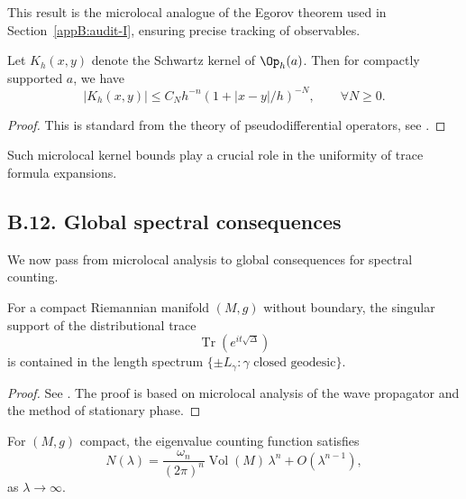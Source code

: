 \begin{remark}
This result is the microlocal analogue of the Egorov theorem used in Section~\ref{appB:audit-I}, ensuring precise tracking of observables.
\end{remark}

\begin{proposition}
\label{prop:micro-kernel}
Let $K_h(x,y)$ denote the Schwartz kernel of $\Op_h(a)$. Then for compactly supported $a$, we have
\[
|K_h(x,y)| \leq C_N h^{-n} (1+|x-y|/h)^{-N}, \qquad \forall N \geq 0.
\]
\end{proposition}

\begin{proof}
This is standard from the theory of pseudodifferential operators, see \cite{HormanderIII}.
\end{proof}

\begin{remark}
Such microlocal kernel bounds play a crucial role in the uniformity of trace formula expansions.
\end{remark}

\medskip

\subsection*{B.12. Global spectral consequences}
\label{appB:global}

We now pass from microlocal analysis to global consequences for spectral counting.

\begin{theorem}
\label{thm:DG}
For a compact Riemannian manifold $(M,g)$ without boundary, the singular support of the distributional trace
\[
\operatorname{Tr}(e^{it\sqrt{\Delta}})
\]
is contained in the length spectrum $\{ \pm L_\gamma : \gamma \text{ closed geodesic}\}$.
\end{theorem}

\begin{proof}
See \cite{DuistermaatGuillemin}. The proof is based on microlocal analysis of the wave propagator and the method of stationary phase.
\end{proof}

\begin{theorem}
\label{thm:weyl}
For $(M,g)$ compact, the eigenvalue counting function satisfies
\[
N(\lambda) = \frac{\omega_n}{(2\pi)^n} \operatorname{Vol}(M) \, \lambda^n + O(\lambda^{n-1}),
\]
as $\lambda \to \infty$.
\end{theorem}

